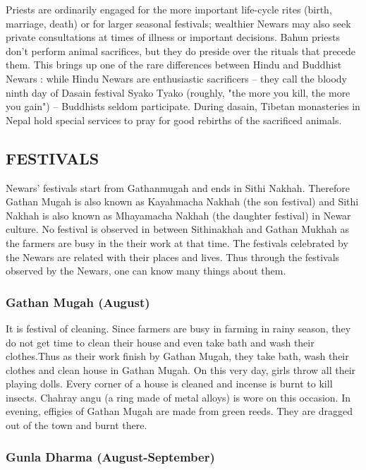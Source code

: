 \documentclass[a4paper,13pt, margin=0.9in]{article}
\begin{document}
\begin{flushleft}
Priests are ordinarily engaged for the more important life-cycle rites (birth, marriage, death) or for larger seasonal festivals; wealthier Newars may also seek private consultations at times of illness or important decisions. Bahun priests don't perform animal sacrifices, but they do preside over the rituals that precede them. This brings up one of the rare differences between Hindu and Buddhist Newars : while Hindu Newars are enthusiastic sacrificers – they call the bloody ninth day of Dasain festival Syako Tyako (roughly, "the more you kill, the more you gain") – Buddhists seldom participate. During dasain, Tibetan monasteries in Nepal hold special services to pray for good rebirths of the sacrificed animals.\\


	\newpage
	\subsection{FESTIVALS}
	Newars' festivals start from Gathanmugah and ends in Sithi Nakhah. Therefore Gathan Mugah is also known as Kayahmacha Nakhah (the son festival) and Sithi Nakhah is also known as Mhayamacha Nakhah (the daughter festival) in Newar culture. No festival is observed in between Sithinakhah and Gathan Mukhah as the farmers are busy in the their work at that time. The festivals celebrated by the Newars are related with their places and lives. Thus through the festivals observed by the Newars, one can know many things about them.

\subsubsection{Gathan Mugah (August)}

It is festival of cleaning. Since farmers are busy in farming in rainy season, they do not get time to clean their house and even take bath and wash their clothes.Thus as their work finish by Gathan Mugah, they take bath, wash their clothes and clean house in Gathan Mugah. On this very day, girls throw all their playing dolls. Every corner of a house is cleaned and incense is burnt to kill insects. Chahray angu (a ring made of metal alloys) is wore on this occasion. In evening, effigies of Gathan Mugah are made from green reeds. They are dragged out of the town and burnt there.

\subsubsection{Gunla Dharma (August-September)}


\end{flushleft}
\end{document}
